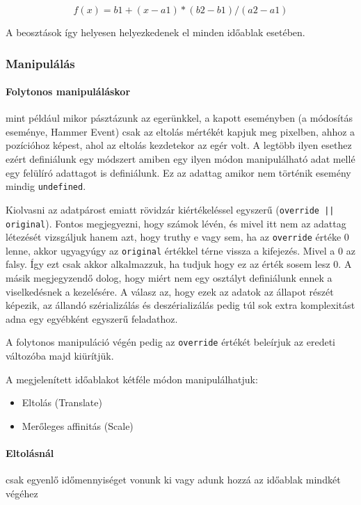 $$ f(x) = b1 + ( x - a1 ) * ( b2 - b1 ) / ( a2 - a1 )$$

A beosztások így helyesen helyezkedenek el minden időablak esetében.

\subsubsection{Manipulálás}

\paragraph{Folytonos manipuláláskor} mint például mikor pásztázunk az egerünkkel, a kapott eseményben (a módosítás eseménye, Hammer Event) csak az eltolás mértékét kapjuk meg pixelben, ahhoz a pozícióhoz képest, ahol az eltolás kezdetekor az egér volt. A legtöbb ilyen esethez ezért definiálunk egy módszert amiben egy ilyen módon manipulálható adat mellé egy felülíró adattagot is definiálunk. Ez az adattag amikor nem történik esemény mindig \lstinline[columns=fixed]{undefined}.

Kiolvasni az adatpárost emiatt rövidzár kiértékeléssel egyszerű (\lstinline[columns=fixed]{override || original}). Fontos megjegyezni, hogy számok lévén, és mivel itt nem az adattag létezését vizsgáljuk hanem azt, hogy truthy e vagy sem, ha az \lstinline[columns=fixed]{override} értéke $0$ lenne, akkor ugyagyúgy az \lstinline[columns=fixed]{original} értékkel térne vissza a kifejezés. Mivel a $0$ az falsy. Így ezt csak akkor alkalmazzuk, ha tudjuk hogy ez az érték sosem lesz $0$. A másik megjegyzendő dolog, hogy miért nem egy osztályt definiálunk ennek a viselkedésnek a kezelésére. A válasz az, hogy ezek az adatok az állapot részét képezik, az állandó szérializálás és deszérializálás pedig túl sok extra komplexitást adna egy egyébként egyszerű feladathoz.

A folytonos manipuláció végén pedig az \lstinline[columns=fixed]{override} értékét beleírjuk az eredeti változóba majd kiürítjük.


A megjelenített időablakot kétféle módon manipulálhatjuk:

\begin{itemize}
	\item Eltolás (Translate)
	\item Merőleges affinitás (Scale)
\end{itemize}

\paragraph{Eltolásnál} csak egyenlő időmennyiséget vonunk ki vagy adunk hozzá az időablak mindkét végéhez

